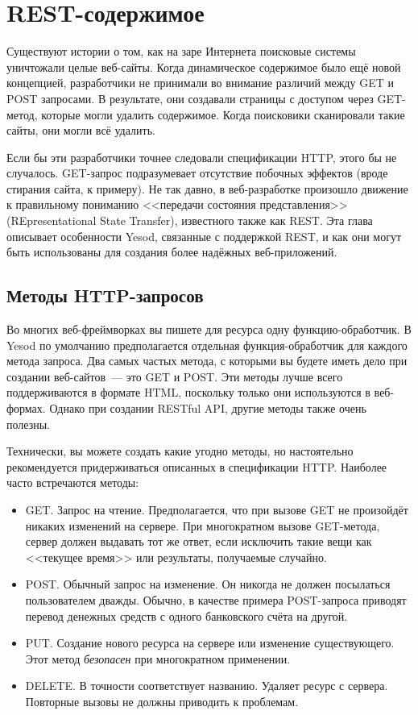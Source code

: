 \chapter{REST-содержимое}\label{chap:restful-content}

Существуют истории о том, как  на заре Интернета поисковые системы уничтожали
целые веб-сайты. Когда динамическое содержимое было ещё новой концепцией,
разработчики не принимали во внимание различий между GET и POST запросами. В
результате, они создавали страницы с доступом через GET-метод, которые могли
удалить содержимое. Когда поисковики сканировали такие сайты, они могли всё
удалить.

Если бы эти разработчики точнее следовали спецификации HTTP, этого бы не
случалось.  GET-запрос подразумевает отсутствие побочных эффектов (вроде
стирания сайта, к примеру).  Не так давно, в веб-разработке произошло движение
к правильному пониманию <<передачи состояния представления>> (REpresentational
State Transfer), известного также как REST.  Эта глава описывает особенности
Yesod, связанные с поддержкой REST, и как они могут быть использованы для
создания более надёжных веб-приложений.

\section{Методы HTTP-запросов}

Во многих веб-фреймворках вы пишете для ресурса одну функцию-обработчик. В
Yesod по умолчанию предполагается отдельная функция-обработчик для каждого
метода запроса. Два самых частых метода, с которыми вы будете иметь дело при
создании веб-сайтов~--- это GET и POST. Эти методы лучше всего поддерживаются в
формате HTML, поскольку только они используются в веб-формах. Однако при
создании RESTful API, другие методы также очень полезны.

Технически, вы можете создать какие угодно методы, но настоятельно
рекомендуется придерживаться описанных в спецификации HTTP. Наиболее часто
встречаются методы:
\begin{itemize}
    \item GET. Запрос на чтение. Предполагается, что при вызове GET не
        произойдёт никаких изменений на сервере. При многократном вызове
        GET-метода, сервер должен выдавать тот же ответ, если исключить такие
        вещи как <<текущее время>> или результаты, получаемые случайно.
    \item POST. Обычный запрос на изменение. Он никогда не должен посылаться
        пользователем дважды. Обычно, в качестве примера POST-запроса приводят
        перевод денежных средств с одного банковского счёта на другой.
    \item PUT. Создание нового ресурса на сервере или изменение существующего.
        Этот метод \emph{безопасен} при многократном применении.
    \item DELETE. В точности соответствует названию. Удаляет ресурс с сервера.
        Повторные вызовы не должны приводить к проблемам.
\end{itemize}

